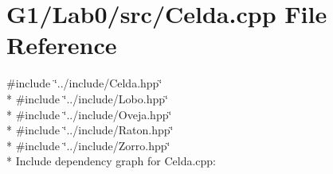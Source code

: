 \section{G1/\+Lab0/src/\+Celda.cpp File Reference}
\label{_celda_8cpp}
{\ttfamily \#include \char`\"{}../include/\+Celda.\+hpp\char`\"{}}\\*
{\ttfamily \#include \char`\"{}../include/\+Lobo.\+hpp\char`\"{}}\\*
{\ttfamily \#include \char`\"{}../include/\+Oveja.\+hpp\char`\"{}}\\*
{\ttfamily \#include \char`\"{}../include/\+Raton.\+hpp\char`\"{}}\\*
{\ttfamily \#include \char`\"{}../include/\+Zorro.\+hpp\char`\"{}}\\*
Include dependency graph for Celda.\+cpp\+:

